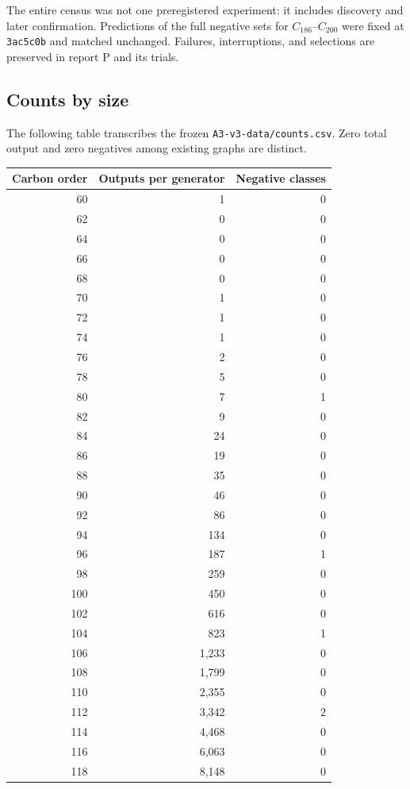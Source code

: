 \documentclass[11pt]{amsart}
\newcommand{\record}[1]{\nolinkurl{#1}}
\begin{document}
The entire census was not one preregistered experiment: it includes
discovery and later confirmation. Predictions of the full negative
sets for $C_{186}$--$C_{200}$ were fixed at \record{3ac5c0b} and matched
unchanged. Failures, interruptions, and selections are preserved in
report P and its trials.

\subsection{Counts by size}
The following table transcribes the frozen \record{A3-v3-data/counts.csv}.
Zero total output and zero negatives among existing graphs are distinct.
\begin{longtable}{rrr}
\toprule Carbon order & Outputs per generator & Negative classes\\\midrule\endhead
60 & 1 & 0 \\
62 & 0 & 0 \\
64 & 0 & 0 \\
66 & 0 & 0 \\
68 & 0 & 0 \\
70 & 1 & 0 \\
72 & 1 & 0 \\
74 & 1 & 0 \\
76 & 2 & 0 \\
78 & 5 & 0 \\
80 & 7 & 1 \\
82 & 9 & 0 \\
84 & 24 & 0 \\
86 & 19 & 0 \\
88 & 35 & 0 \\
90 & 46 & 0 \\
92 & 86 & 0 \\
94 & 134 & 0 \\
96 & 187 & 1 \\
98 & 259 & 0 \\
100 & 450 & 0 \\
102 & 616 & 0 \\
104 & 823 & 1 \\
106 & 1,233 & 0 \\
108 & 1,799 & 0 \\
110 & 2,355 & 0 \\
112 & 3,342 & 2 \\
114 & 4,468 & 0 \\
116 & 6,063 & 0 \\
118 & 8,148 & 0 \\

\end{longtable}
\end{document}
